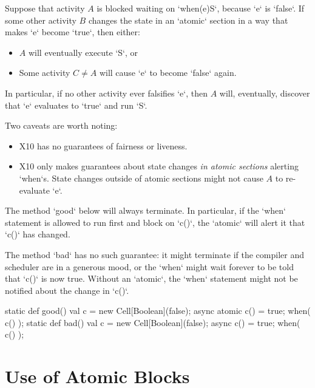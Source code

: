 Suppose that activity {$A$} is blocked waiting on \xcd`when(e)S`, because
\xcd`e` is \xcd`false`.    If some other activity {$B$} changes the state 
in an \xcd`atomic` section 
in a
way that makes \xcd`e` become \xcd`true`, then either: 
\begin{itemize}
\item {$A$} will eventually execute \xcd`S`, or
\item Some activity {$C \ne A$} will cause \xcd`e` to become \xcd`false` again.
\end{itemize}
In particular, if no other activity ever falsifies \xcd`e`, then {$A$} will,
eventually, discover that \xcd`e` evaluates to \xcd`true` and run \xcd`S`.

Two caveats are worth noting: 
\begin{itemize}
\item X10 has no guarantees of fairness or liveness.
\item X10 only makes guarantees about state changes {\em in atomic sections}
      alerting \xcd`when`s.  State changes outside of atomic sections might
      not cause {$A$} to re-evaluate \xcd`e`.  
\end{itemize}

\begin{ex}
The method \xcd`good` below will always terminate.  In particular, if the
\xcd`when` statement is allowed to run first and block on \xcd`c()`, the
\xcd`atomic` will alert it that \xcd`c()` has changed. 

The method \xcd`bad` has
no such guarantee: it might terminate if the compiler and scheduler are in a
generous mood, or the \xcd`when` might wait forever to be told that \xcd`c()`
is now true.   Without an \xcd`atomic`, the \xcd`when` statement might not be
notified about the change in \xcd`c()`.  
\begin{xten}
static def good() {
  val c = new Cell[Boolean](false);
  async {
    atomic {c() = true;}
  }
  when( c() ); 
}
static def bad() {
  val c = new Cell[Boolean](false);
  async {
    c() = true;
  }
  when( c() ); 
}
\end{xten}


\end{ex}



\section{Use of Atomic Blocks}

